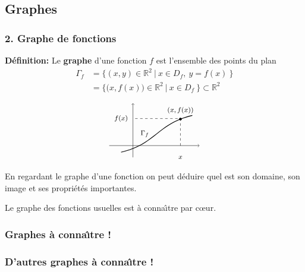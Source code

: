 \documentclass[10pt]{beamer}
\newcommand{\R}{\mathbb R}
\begin{document}
\subsection{Graphes} 

\begin{frame}[plain]
\frametitle{\bf 2. Graphe de fonctions} 
\medskip 

{\bf D\'efinition:} 
Le {\bf graphe} d'une fonction $f$ est l'ensemble des points du plan
\begin{align*}
\Gamma_f & = \Big\{ (x,y)\in \R^2\ |\ x\in D_f,\ y=f(x)\ \Big\} \\ 
& = \Big\{ \big(x,f(x)\big)\in \R^2\ |\ x\in D_f\ \Big\}
\subset \R^2
\end{align*}

$$
\grapheF
$$

\pause
En regardant le graphe d'une fonction on peut d\'eduire quel est son domaine, 
son image et ses propri\'et\'es importantes. 
\vspace*{3mm}

\pause
Le graphe des fonctions usuelles est \`a conna\^{\i}tre par c{\oe}ur.  

\end{frame}


\begin{frame}
\frametitle{\bf Graphes \`a conna\^{\i}tre !} 
\medskip 

\grapheX \quad \grapheXX \quad \grapheXXX %

\grapheXinv \quad \grapheXXinv \quad \grapheXXXinv %

\grapheXsqrtII \quad \grapheXsqrtIII \quad \grapheXsqrtIV %

\end{frame}


\begin{frame}[plain]
\frametitle{\bf D'autres graphes \`a conna\^{\i}tre !} 
\medskip 

\grapheXVA \quad \grapheXXXVA \quad \grapheXinvVA \quad %

\grapheSIN \quad \grapheCOS \quad \grapheTAN %

\grapheASIN \quad \grapheACOS \quad \grapheATAN %

\end{frame}
\end{document}
